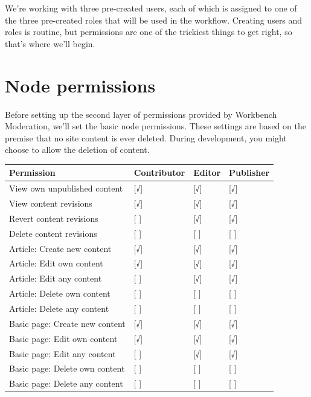 \documentclass[letterpaper,10pt,english]{sphinxmanual}
\begin{document}
We're working with three pre-created users, each of which is assigned to one of the three pre-created roles that will be used in the workflow. Creating users and roles is routine, but permissions are one of the trickiest things to get right, so that's where we'll begin.


\section{Node permissions}
\label{moderation:node-permissions}
Before setting up the second layer of permissions provided by Workbench Moderation, we'll set the basic node permissions. These settings are based on the premise that no site content is ever deleted. During development, you might choose to allow the deletion of content.

\begin{tabulary}{\linewidth}{|L|L|L|L|}
\hline
\textbf{
Permission
} & \textbf{
Contributor
} & \textbf{
Editor
} & \textbf{
Publisher
}\\\hline

View own unpublished content
 & 
{[}√{]}
 & 
{[}√{]}
 & 
{[}√{]}
\\\hline

View content revisions
 & 
{[}√{]}
 & 
{[}√{]}
 & 
{[}√{]}
\\\hline

Revert content revisions
 & 
{[} {]}
 & 
{[}√{]}
 & 
{[}√{]}
\\\hline

Delete content revisions
 & 
{[} {]}
 & 
{[} {]}
 & 
{[} {]}
\\\hline

Article: Create new content
 & 
{[}√{]}
 & 
{[}√{]}
 & 
{[}√{]}
\\\hline

Article: Edit own content
 & 
{[}√{]}
 & 
{[}√{]}
 & 
{[}√{]}
\\\hline

Article: Edit any content
 & 
{[} {]}
 & 
{[}√{]}
 & 
{[}√{]}
\\\hline

Article: Delete own content
 & 
{[} {]}
 & 
{[} {]}
 & 
{[} {]}
\\\hline

Article: Delete any content
 & 
{[} {]}
 & 
{[} {]}
 & 
{[} {]}
\\\hline

Basic page: Create new content
 & 
{[}√{]}
 & 
{[}√{]}
 & 
{[}√{]}
\\\hline

Basic page: Edit own content
 & 
{[}√{]}
 & 
{[}√{]}
 & 
{[}√{]}
\\\hline

Basic page: Edit any content
 & 
{[} {]}
 & 
{[}√{]}
 & 
{[}√{]}
\\\hline

Basic page: Delete own content
 & 
{[} {]}
 & 
{[} {]}
 & 
{[} {]}
\\\hline

Basic page: Delete any content
 & 
{[} {]}
 & 
{[} {]}
 & 
{[} {]}
\\\hline
\end{tabulary}
\end{document}

